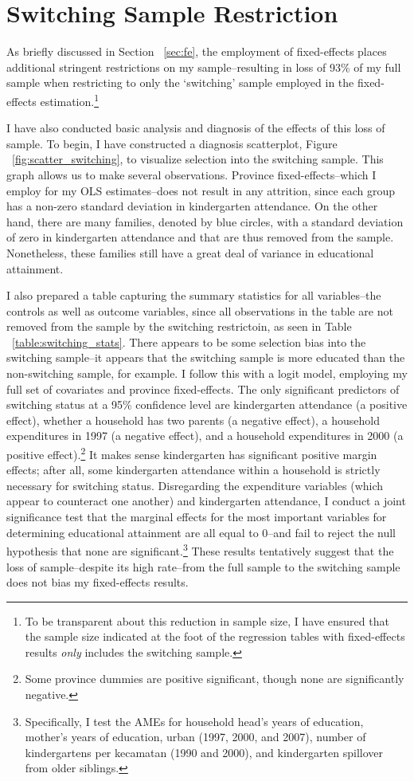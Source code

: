 \section{Switching Sample Restriction}
	\label{app:switching}
As briefly discussed in Section ~\ref{sec:fe}, the employment of fixed-effects places additional stringent restrictions on my sample--resulting in loss of 93\% of my full sample when restricting to only the `switching' sample employed in the fixed-effects estimation.\footnote{To be transparent about this reduction in sample size, I have ensured that the sample size indicated at the foot of the regression tables with fixed-effects results \textit{only} includes the switching sample.}

I have also conducted basic analysis and diagnosis of the effects of this loss of sample. To begin, I have constructed a diagnosis scatterplot, Figure ~\ref{fig:scatter_switching}, to visualize selection into the switching sample. This graph allows us to make several observations. Province fixed-effects--which I employ for my OLS estimates--does not result in any attrition, since each group has a non-zero standard deviation in kindergarten attendance. On the other hand, there are many families, denoted by blue circles, with a standard deviation of zero in kindergarten attendance and that are thus removed from the sample. Nonetheless, these families still have a great deal of variance in educational attainment.

I also prepared a table capturing the summary statistics for all variables--the controls as well as outcome variables, since all observations in the table are not removed from the sample by the switching restrictoin, as seen in Table ~\ref{table:switching_stats}. There appears to be some selection bias into the switching sample--it appears that the switching sample is more educated than the non-switching sample, for example. I follow this with a logit model, employing my full set of covariates and province fixed-effects. The only significant predictors of switching status at a 95\% confidence level are kindergarten attendance (a positive effect), whether a household has two parents (a negative effect), a household expenditures in 1997 (a negative effect), and a household expenditures in 2000 (a positive effect).\footnote{ Some province dummies are positive significant, though none are significantly negative.} It makes sense kindergarten has significant positive margin effects; after all, some kindergarten attendance within a household is strictly necessary for switching status. Disregarding the expenditure variables (which appear to counteract one another) and kindergarten attendance, I conduct a joint significance test that the marginal effects for the most important variables for determining educational attainment are all equal to 0--and fail to reject the null hypothesis that none are significant.\footnote{ Specifically, I test the AMEs for household head's years of education, mother's years of education, urban (1997, 2000, and 2007), number of kindergartens per kecamatan (1990 and 2000), and kindergarten spillover from older siblings.} These results tentatively suggest that the loss of sample--despite its high rate--from the full sample to the switching sample does not bias my fixed-effects results.

